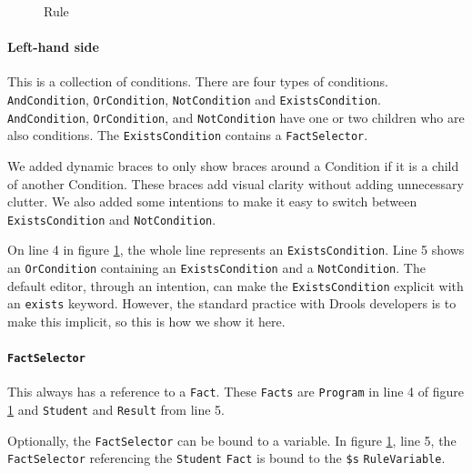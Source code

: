 \begin{figure}[h]
    \centering
    \caption{Rule}
    \label{fig:Rule}
\end{figure}

\paragraph{Left-hand side} This is a collection of conditions.
There are four types of conditions.
\texttt{AndCondition}, \texttt{OrCondition}, \texttt{NotCondition} and \texttt{ExistsCondition}.
\texttt{AndCondition}, \texttt{OrCondition}, and \texttt{NotCondition} have one or two children who are also conditions.
The \texttt{ExistsCondition} contains a \texttt{FactSelector}.

We added dynamic braces to only show braces around a Condition if it is a child of another Condition.
These braces add visual clarity without adding unnecessary clutter.
We also added some intentions to make it easy to switch between \texttt{ExistsCondition} and \texttt{NotCondition}.

On line 4 in figure \ref{fig:Rule}, the whole line represents an \texttt{ExistsCondition}.
Line 5 shows an \texttt{OrCondition} containing an \texttt{ExistsCondition} and a \texttt{NotCondition}.
The default editor, through an intention, can make the \texttt{ExistsCondition} explicit with an \texttt{exists} keyword.
However, the standard practice with Drools developers is to make this implicit, so this is how we show it here.

\paragraph{\texttt{FactSelector}} This always has a reference to a \texttt{Fact}.
These \texttt{Facts} are \texttt{Program} in line 4 of figure \ref{fig:Rule} and \texttt{Student} and \texttt{Result} from line 5.

Optionally, the \texttt{FactSelector} can be bound to a variable.
In figure \ref{fig:Rule}, line 5, the \texttt{FactSelector} referencing the \texttt{Student} \texttt{Fact} is bound to the \texttt{\$s} \texttt{RuleVariable}.

